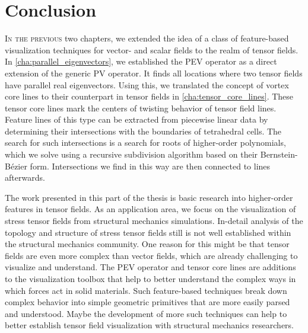\chapter{Conclusion} %
\label{cha:tensor_vis_conclusions}
%
\lettrine[lhang=0.06, loversize=-0.015, findent=-1pt]{I}{n the previous} two
chapters, we extended the idea of a class of feature-based visualization
techniques for vector- and scalar fields to the realm of tensor fields.
%
In \cref{cha:parallel_eigenvectors}, we established the \ac{PEV} operator as a
direct extension of the generic \ac{PV} operator.
%
It finds all locations where two tensor fields have parallel real eigenvectors.
%
Using this, we translated the concept of vortex core lines to their counterpart
in tensor fields in \cref{cha:tensor_core_lines}.
%
These tensor core lines mark the centers of twisting behavior of tensor field
lines.
%
Feature lines of this type can be extracted from piecewise linear data by
determining their intersections with the boundaries of tetrahedral cells.
%
The search for such intersections is a search for roots of higher-order
polynomials, which we solve using a recursive subdivision algorithm based on
their Bernstein-B\'ezier form.
%
Intersections we find in this way are then connected to lines afterwards.
%

%
The work presented in this part of the thesis is basic research into
higher-order features in tensor fields.
%
As an application area, we focus on the visualization of stress tensor fields
from structural mechanics simulations.
%
In-detail analysis of the topology and structure of stress tensor fields still
is not well established within the structural mechanics community.
%
One reason for this might be that tensor fields are even more complex than
vector fields, which are already challenging to visualize and understand.
%
The \ac{PEV} operator and tensor core lines are additions to the visualization
toolbox that help to better understand the complex ways in which forces act in
solid materials.
%
Such feature-based techniques break down complex behavior into simple geometric
primitives that are more easily parsed and understood.
%
Maybe the development of more such techniques can help to better establish
tensor field visualization with structural mechanics researchers.
%
